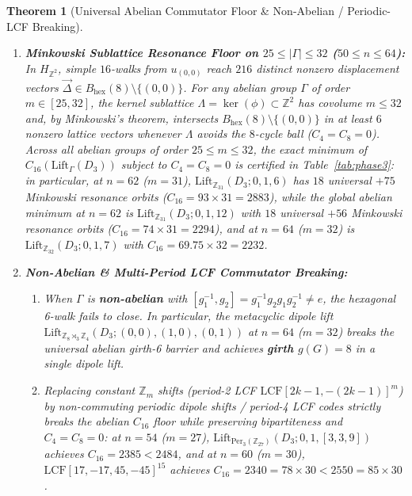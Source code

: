 \documentclass[10pt,a4paper]{article}
\newtheorem{theorem}{Theorem}[section]
\theoremstyle{definition}
\theoremstyle{remark}
\begin{document}
\begin{theorem}[Universal Abelian Commutator Floor \& Non-Abelian / Periodic-LCF Breaking]
\begin{enumerate}[label=(\alph*),nosep]
  \item \textbf{Minkowski Sublattice Resonance Floor on $25 \le |\Gamma| \le 32$ ($50 \le n \le 64$):} In $H_{\mathbb{Z}^2}$, simple $16$-walks from $u_{(0,0)}$ reach $216$ distinct nonzero displacement vectors $\vec{\Delta} \in B_{\mathrm{hex}}(8) \setminus \{(0,0)\}$. For any abelian group $\Gamma$ of order $m \in [25, 32]$, the kernel sublattice $\Lambda = \ker(\phi) \subset \mathbb{Z}^2$ has covolume $m \le 32$ and, by Minkowski's theorem, intersects $B_{\mathrm{hex}}(8) \setminus \{(0,0)\}$ in at least $6$ nonzero lattice vectors whenever $\Lambda$ avoids the $8$-cycle ball ($C_4 = C_8 = 0$). Across all abelian groups of order $25 \le m \le 32$, the exact minimum of $C_{16}(\mathrm{Lift}_\Gamma(D_3))$ subject to $C_4 = C_8 = 0$ is certified in Table~\ref{tab:phase3}: in particular, at $n = 62$ ($m = 31$), $\mathrm{Lift}_{\mathbb{Z}_{31}}(D_3; 0, 1, 6)$ has $18$ universal $+ 75$ Minkowski resonance orbits ($C_{16} = 93 \times 31 = 2883$), while the global abelian minimum at $n = 62$ is $\mathrm{Lift}_{\mathbb{Z}_{31}}(D_3; 0, 1, 12)$ with $18$ universal $+ 56$ Minkowski resonance orbits ($C_{16} = 74 \times 31 = 2294$), and at $n = 64$ ($m = 32$) is $\mathrm{Lift}_{\mathbb{Z}_{32}}(D_3; 0, 1, 7)$ with $C_{16} = 69.75 \times 32 = 2232$.
  \item \textbf{Non-Abelian \& Multi-Period LCF Commutator Breaking:}
  \begin{enumerate}[label=(\roman*),nosep]
    \item When $\Gamma$ is \textbf{non-abelian} with $[g_1^{-1}, g_2] = g_1^{-1} g_2 g_1 g_2^{-1} \ne e$, the hexagonal 6-walk fails to close. In particular, the metacyclic dipole lift $\mathrm{Lift}_{\mathbb{Z}_8 \rtimes_3 \mathbb{Z}_4}(D_3; (0,0), (1,0), (0,1))$ at $n = 64$ ($m = 32$) breaks the universal abelian girth-6 barrier and achieves \textbf{girth $g(G) = 8$} in a single dipole lift.
    \item Replacing constant $\mathbb{Z}_m$ shifts (period-2 LCF $\mathrm{LCF}[2k-1, -(2k-1)]^m$) by non-commuting periodic dipole shifts / period-4 LCF codes strictly breaks the abelian $C_{16}$ floor while preserving bipartiteness and $C_4 = C_8 = 0$: at $n = 54$ ($m = 27$), $\mathrm{Lift}_{\mathrm{Per}_3(\mathbb{Z}_{27})}(D_3; 0, 1, [3, 3, 9])$ achieves $C_{16} = 2385 < 2484$, and at $n = 60$ ($m = 30$), $\mathrm{LCF}[17, -17, 45, -45]^{15}$ achieves $C_{16} = 2340 = 78 \times 30 < 2550 = 85 \times 30$.
  \end{enumerate}
\end{enumerate}
\end{theorem}
\end{document}
